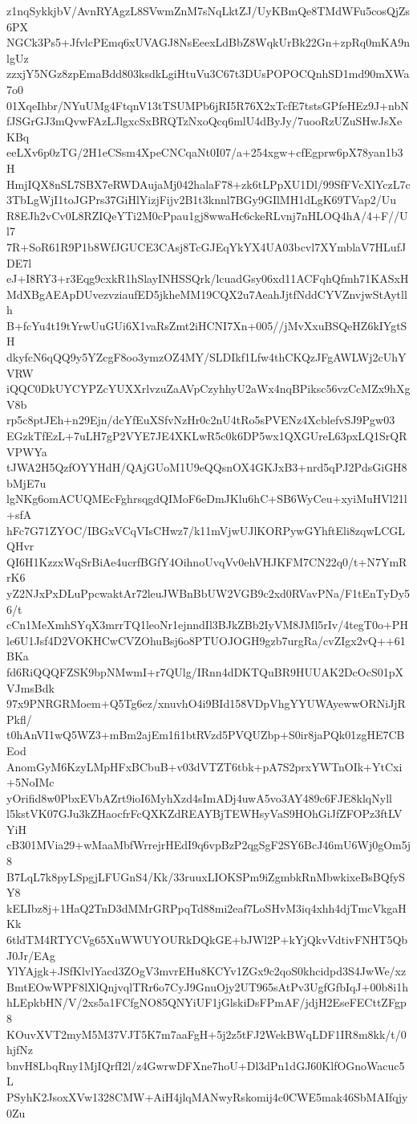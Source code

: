 z1nqSykkjbV/AvnRYAgzL8SVwmZnM7sNqLktZJ/UyKBmQe8TMdWFu5cosQjZs6PX
NGCk3Ps5+JfvlcPEmq6xUVAGJ8NsEeexLdBbZ8WqkUrBk22Gn+zpRq0mKA9nlgUz
zzxjY5NGz8zpEmaBdd803ksdkLgiHtuVu3C67t3DUsPOPOCQnhSD1md90mXWa7o0
01XqeIhbr/NYuUMg4FtqnV13tTSUMPb6jRI5R76X2xTcfE7tstsGPfeHEz9J+nbN
fJSGrGJ3mQvwFAzLJlgxcSxBRQTzNxoQcq6mlU4dByJy/7uooRzUZuSHwJsXeKBq
eeLXv6p0zTG/2H1eCSsm4XpeCNCqaNt0I07/a+254xgw+cfEgprw6pX78yan1b3H
HmjIQX8nSL7SBX7eRWDAujaMj042halaF78+zk6tLPpXU1Dl/99SfFVcXlYczL7c
3TbLgWjI1toJGPrs37GiHlYizjFijv2B1t3knnl7BGy9GIlMH1dLgK69TVap2/Uu
R8EJh2vCv0L8RZIQeYTi2M0cPpau1gj8wwaHc6ckeRLvnj7nHLOQ4hA/4+F//Ul7
7R+SoR61R9P1b8WfJGUCE3CAsj8TcGJEqYkYX4UA03bcvl7XYmblaV7HLufJDE7l
eJ+I8RY3+r3Eqg9cxkR1hSlayINHSSQrk/lcuadGsy06xd11ACFqhQfmh71KASxH
MdXBgAEApDUvezvziaufED5jkheMM19CQX2u7AeahJjtfNddCYVZnvjwStAytllh
B+fcYu4t19tYrwUuGUi6X1vaRsZmt2iHCNI7Xn+005//jMvXxuBSQeHZ6kIYgtSH
dkyfcN6qQQ9y5YZcgF8oo3ymzOZ4MY/SLDIkf1Lfw4thCKQzJFgAWLWj2cUhYVRW
iQQC0DkUYCYPZcYUXXrlvzuZaAVpCzyhhyU2aWx4nqBPiksc56vzCcMZx9hXgV8b
rp5c8ptJEh+n29Ejn/dcYfEuXSfvNzHr0c2nU4tRo5sPVENz4XcblefvSJ9Pgw03
EGzkTfEzL+7uLH7gP2VYE7JE4XKLwR5c0k6DP5wx1QXGUreL63pxLQ1SrQRVPWYa
tJWA2H5QzfOYYHdH/QAjGUoM1U9eQQsnOX4GKJxB3+nrd5qPJ2PdsGiGH8bMjE7u
lgNKg6omACUQMEcFghrsqgdQIMoF6eDmJKlu6hC+SB6WyCeu+xyiMuHVl21l+sfA
hFc7G71ZYOC/IBGxVCqVIsCHwz7/k11mVjwUJlKORPywGYhftEli8zqwLCGLQHvr
QI6H1KzzxWqSrBiAe4ucrfBGfY4OihnoUvqVv0ehVHJKFM7CN22q0/t+N7YmRrK6
yZ2NJxPxDLuPpcwaktAr72leuJWBnBbUW2VGB9c2xd0RVavPNa/F1tEnTyDy56/t
cCn1MeXmhSYqX3mrrTQ1leoNr1ejnndIl3BJkZBb2IyVM8JMl5rIv/4tegT0o+PH
le6U1Jsf4D2VOKHCwCVZOhuBsj6o8PTUOJOGH9gzb7urgRa/cvZIgx2vQ++61BKa
fd6RiQQQFZSK9bpNMwmI+r7QUlg/IRnn4dDKTQuBR9HUUAK2DcOcS01pXVJmsBdk
97x9PNRGRMoem+Q5Tg6ez/xnuvhO4i9BId158VDpVhgYYUWAyewwORNiJjRPkfl/
t0hAnVI1wQ5WZ3+mBm2ajEm1fi1btRVzd5PVQUZbp+S0ir8jaPQk01zgHE7CBEod
AnomGyM6KzyLMpHFxBCbuB+v03dVTZT6tbk+pA7S2prxYWTnOIk+YtCxi+5NoIMc
yOrifid8w0PbxEVbAZrt9ioI6MyhXzd4sImADj4uwA5vo3AY489c6FJE8klqNyll
l5kstVK07GJu3kZHaocfrFcQXKZdREAYBjTEWHsyVaS9HOhGiJfZFOPz3ftLVYiH
cB301MVia29+wMaaMbfWrrejrHEdI9q6vpBzP2qgSgF2SY6BcJ46mU6Wj0gOm5j8
B7LqL7k8pyLSpgjLFUGnS4/Kk/33ruuxLIOKSPm9iZgmbkRnMbwkixeBsBQfySY8
kELIbz8j+1HaQ2TnD3dMMrGRPpqTd88mi2eaf7LoSHvM3iq4xhh4djTmcVkgaHKk
6tldTM4RTYCVg65XuWWUYOURkDQkGE+bJWl2P+kYjQkvVdtivFNHT5QbJ0Jr/EAg
YlYAjgk+JSfKlvlYacd3ZOgV3mvrEHu8KCYv1ZGx9c2qoS0khcidpd3S4JwWe/xz
BmtEOwWPF8lXlQnjvqlTRr6o7CyJ9GnuOjy2UT965sAtPv3UgfGfbIqJ+00b8i1h
hLEpkbHN/V/2xs5a1FCfgNO85QNYiUF1jGlskiDsFPmAF/jdjH2EseFECttZFgp8
KOuvXVT2myM5M37VJT5K7m7aaFgH+5j2z5tFJ2WekBWqLDF1IR8m8kk/t/0hjfNz
bnvH8LbqRny1MjIQrfI2l/z4GwrwDFXne7hoU+Dl3dPn1dGJ60KlfOGnoWacuc5L
PSyhK2JsoxXVw1328CMW+AiH4jlqMANwyRskomij4c0CWE5mak46SbMAIfqjy0Zu

